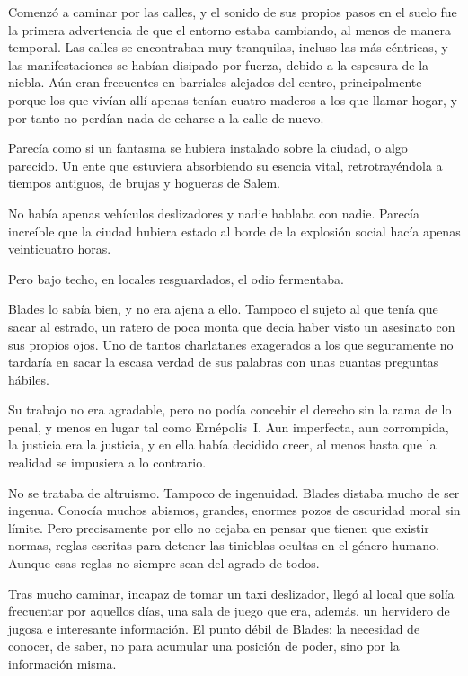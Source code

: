Comenzó a caminar por las calles, y el sonido de sus propios pasos en el suelo fue la primera advertencia de que el entorno estaba cambiando, al menos de manera temporal. Las calles se encontraban muy tranquilas, incluso las más céntricas, y las manifestaciones se habían disipado por fuerza, debido a la espesura de la niebla. Aún eran frecuentes en barriales alejados del centro, principalmente porque los que vivían allí apenas tenían cuatro maderos a los que llamar hogar, y por tanto no perdían nada de echarse a la calle de nuevo.

Parecía como si un fantasma se hubiera instalado sobre la ciudad, o algo parecido. Un ente que estuviera absorbiendo su esencia vital, retrotrayéndola a tiempos antiguos, de brujas y hogueras de Salem.

No había apenas vehículos deslizadores y nadie hablaba con nadie. Parecía increíble que la ciudad hubiera estado al borde de la explosión social hacía apenas veinticuatro horas.

Pero bajo techo, en locales resguardados, el odio fermentaba.

Blades lo sabía bien, y no era ajena a ello. Tampoco el sujeto al que tenía que sacar al estrado, un ratero de poca monta que decía haber visto un asesinato con sus propios ojos. Uno de tantos charlatanes exagerados a los que seguramente no tardaría en sacar la escasa verdad de sus palabras con unas cuantas preguntas hábiles.

Su trabajo no era agradable, pero no podía concebir el derecho sin la rama de lo penal, y menos en lugar tal como Ernépolis~I. Aun imperfecta, aun corrompida, la justicia era la justicia, y en ella había decidido creer, al menos hasta que la realidad se impusiera a lo contrario.

No se trataba de altruismo. Tampoco de ingenuidad. Blades distaba mucho de ser ingenua. Conocía muchos abismos, grandes, enormes pozos de oscuridad moral sin límite. Pero precisamente por ello no cejaba en pensar que tienen que existir normas, reglas escritas para detener las tinieblas ocultas en el género humano.
Aunque esas reglas no siempre sean del agrado de todos.

Tras mucho caminar, incapaz de tomar un taxi deslizador, llegó al local que solía frecuentar por aquellos días, una sala de juego que era, además, un hervidero de jugosa e interesante información. El punto débil de Blades: la necesidad de conocer, de saber, no para acumular una posición de poder, sino por la información misma.

